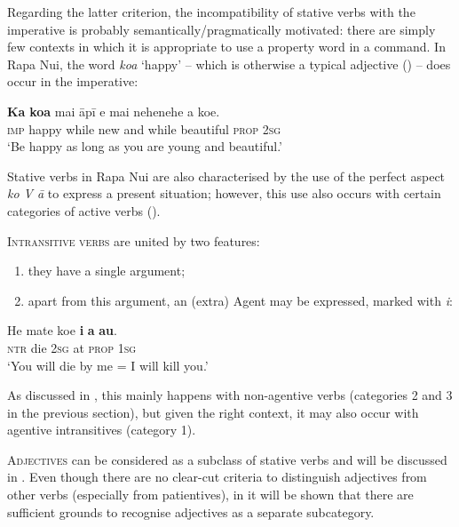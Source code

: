 Regarding the latter criterion, the incompatibility of stative verbs with the imperative is probably semantically/pragmatically motivated: there are simply few contexts in which it is appropriate to use a property word in a command. In Rapa Nui, the word \textit{koa} ‘happy’ – which is otherwise a typical adjective () – does occur in the imperative:

\ea\label{ex:3.90}
\gll \textbf{Ka} \textbf{koa} mai {\ꞌ}āpī {\ꞌ}e mai nehenehe a koe. \\
\textsc{imp} happy while new and while beautiful \textsc{prop} \textsc{2sg} \\

\glt
‘Be happy as long as you are young and beautiful.’ \textstyleExampleref{[R453.018]} 
\z

Stative verbs in Rapa Nui are also characterised by the use of the perfect aspect \textit{ko V {\ꞌ}ā} to express a present situation; however, this use also occurs with certain categories of active verbs ().

\textsc{Intransitive verbs} are united by two features:

\begin{enumerate}
\item 
they have a single argument;

\item 
apart from this argument, an (extra) Agent may be expressed, marked with \textit{i}:

\end{enumerate}

\ea\label{ex:3.91}
\gll He mate koe \textbf{i} \textbf{a} \textbf{au}. \\
\textsc{ntr} die \textsc{2sg} at \textsc{prop} \textsc{1sg} \\

\glt
‘You will die by me = I will kill you.’ \textstyleExampleref{[Mtx-3-01.147]}
\z

As discussed in , this mainly happens with non-agentive verbs (categories 2 and 3 in the previous section), but given the right context, it may also occur with agentive intransitives (category 1).

\textsc{Adjectives} can be considered as a subclass of stative verbs and will be discussed in . Even though there are no clear-cut criteria to distinguish adjectives from other verbs (especially from patientives), in  it will be shown that there are sufficient grounds to recognise adjectives as a separate subcategory.

